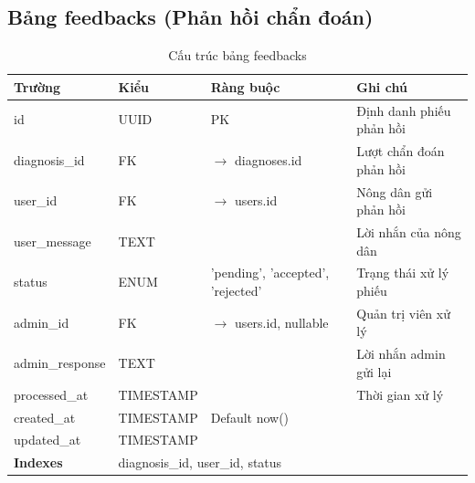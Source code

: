 \documentclass[12pt,a4paper]{article}
\begin{document}
\subsection{Bảng feedbacks (Phản hồi chẩn đoán)}
\begin{longtable}{|l|l|l|p{5.5cm}|}
    \caption{Cấu trúc bảng feedbacks}                                                                                                      \\
    \hline
    \rowcolor{headerblue}
    \textbf{Trường}  & \textbf{Kiểu}                                        & \textbf{Ràng buộc}                & \textbf{Ghi chú}         \\
    \hline
    id               & UUID                                                 & PK                                & Định danh phiếu phản hồi \\
    \hline
    diagnosis\_id    & FK                                                   & $\rightarrow$ diagnoses.id        & Lượt chẩn đoán phản hồi  \\
    \hline
    user\_id         & FK                                                   & $\rightarrow$ users.id            & Nông dân gửi phản hồi    \\
    \hline
    user\_message    & TEXT                                                 &                                   & Lời nhắn của nông dân    \\
    \hline
    status           & ENUM                                                 & 'pending', 'accepted', 'rejected' & Trạng thái xử lý phiếu   \\
    \hline
    admin\_id        & FK                                                   & $\rightarrow$ users.id, nullable  & Quản trị viên xử lý      \\
    \hline
    admin\_response  & TEXT                                                 &                                   & Lời nhắn admin gửi lại   \\
    \hline
    processed\_at    & TIMESTAMP                                            &                                   & Thời gian xử lý          \\
    \hline
    created\_at      & TIMESTAMP                                            & Default now()                     &                          \\
    \hline
    updated\_at      & TIMESTAMP                                            &                                   &                          \\
    \hline
    \rowcolor{headerblue}
    \textbf{Indexes} & \multicolumn{3}{l|}{diagnosis\_id, user\_id, status}                                                                \\
    \hline
\end{longtable}
\end{document}
